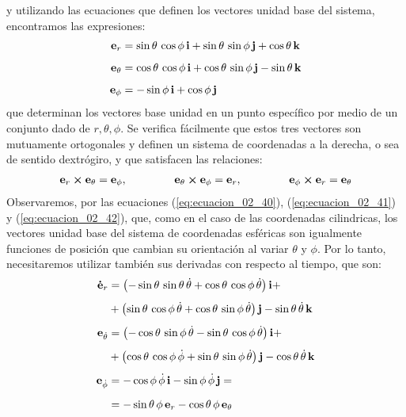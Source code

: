 \documentclass[12pt]{article}
\begin{document}
y utilizando las ecuaciones que definen los vectores unidad base del sistema, encontramos las expresiones:
\begin{align}
    \vb{e}_{r} &= \sin \theta \, \cos \phi \, \vb{i} + \sin \theta \, \sin \phi \, \vb{j} + \cos \theta \, \vb{k} \label{eq:ecuacion_02_40} \\[0.5em]
    \vb{e}_{\theta} &= \cos \theta \, \cos \phi \, \vb{i} + \cos \theta \, \sin \phi \, \vb{j} - \sin \theta \, \vb{k} \label{eq:ecuacion_02_41} \\[0.5em]
    \vb{e}_{\phi} &= - \sin \phi \, \vb{i} + \cos \phi \, \vb{j} \label{eq:ecuacion_02_42}
\end{align}
que determinan los vectores base unidad en un punto específico por medio de un conjunto dado de $r, \theta, \phi$. Se verifica fácilmente que estos tres vectores son mutuamente ortogonales y definen un sistema de coordenadas a la derecha, o sea de sentido dextrógiro, y que satisfacen las relaciones:
\begin{align}
    \vb{e}_{r} \cp \vb{e}_{\theta} = \vb{e}_{\phi}, \hspace{1.5cm} \vb{e}_{\theta} \cp \vb{e}_{\phi} = \vb{e}_{r}, \hspace{1.5cm} \vb{e}_{\phi} \cp \vb{e}_{r} = \vb{e}_{\theta} \label{eq:ecuacion_02_43}
\end{align}
Observaremos, por las ecuaciones (\ref{eq:ecuacion_02_40}), (\ref{eq:ecuacion_02_41}) y (\ref{eq:ecuacion_02_42}), que, como en el caso de las coordenadas cilindricas, los vectores unidad base del sistema de coordenadas esféricas son igualmente funciones de posición que cambian su orientación al variar $\theta$ y $\phi$. Por lo tanto, necesitaremos utilizar también sus derivadas con respecto al tiempo, que son: 
\begin{align}
    \vb{\dot{e}}_{r} &= \left( - \sin \theta \, \sin \theta \, \dot{\theta} + \cos \theta \, \cos \phi \, \dot{\theta} \right) \vb{i} + \nonumber \\[0.5em] 
    &+ \left( \sin \theta \, \cos \phi \, \dot{\theta} + \cos \theta \, \sin \phi \, \dot{\theta} \right) \vb{j} - \sin \theta \, \dot{\theta} \, \vb{k} \label{eq:ecuacion_02_44} \\[0.5em]
    \vb{e}_{\dot{\theta}} &= \left( - \cos \theta \, \sin \phi \, \dot{\theta} - \sin \theta \, \cos \phi \, \dot{\theta} \right) \vb{i} + \nonumber \\[0.5em]
    &+ \left( \cos \theta \, \cos \phi \, \dot{\phi} + \sin \theta \, \sin \phi \, \dot{\theta} \right) \vb{j} - \cos \theta \, \dot{\theta} \, \vb{k} \label{eq:ecuacion_02_45} \\[0.5em]
    \vb{e}_{\dot{\phi}} &= - \cos \phi \, \dot{\phi} \, \vb{i} - \sin \phi \, \dot{\phi} \, \vb{j} = \nonumber \\[0.5em]
    &= - \sin \theta \, \phi \, \vb{e}_{r} - \cos \theta \, \phi \, \vb{e}_{\theta} \label{eq:ecuacion_02_46}
\end{align}
\end{document}
